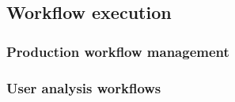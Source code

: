 \subsection{Workflow execution}

\subsubsection{Production workflow management}





\subsubsection{User analysis workflows}







